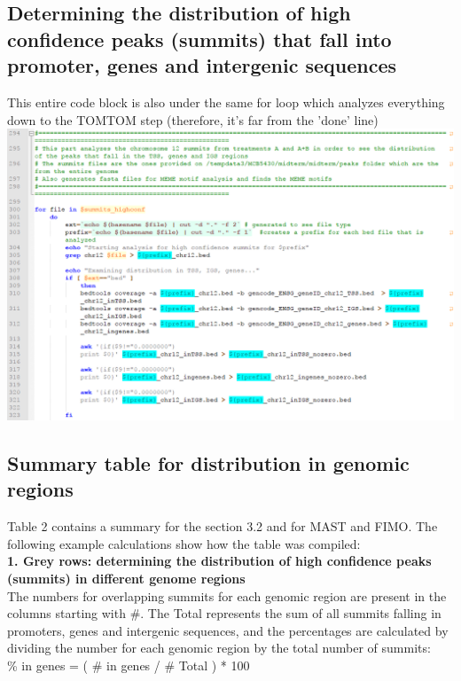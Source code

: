 \documentclass[a4paper,11pt]{article}
\begin{document}
\subsection{Determining the distribution of high confidence peaks (summits) that fall into promoter, genes and intergenic sequences}
\noindent This entire code block is also under the same for loop which analyzes everything down to the TOMTOM step (therefore, it's far from the 'done' line)\\
 
\noindent \includegraphics[scale=0.75]{Summits1.PNG}

\subsection{Summary table for distribution in genomic regions}
\noindent Table 2 contains a summary for the section 3.2 and for MAST and FIMO. The following example calculations show how the table was compiled:\\

\noindent \textbf{1. Grey rows: determining the distribution of high confidence peaks (summits) in different genome regions}\\

\noindent The numbers for overlapping summits for each genomic region are present in the columns starting with \#. The Total represents the sum of all summits falling in promoters, genes and intergenic sequences, and the percentages are calculated by dividing the number for each genomic region by the total number of summits:\\

\% in genes = ( \# in genes / \# Total ) * 100  \\
\end{document}
